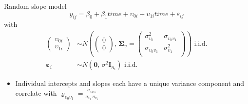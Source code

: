 \documentclass[aspectratio=169]{beamer}
\newcommand{\vect}[1]{\mathbf{#1}}
\newcommand{\mat}[1]{\mathbf{#1}}
\newcommand{\gvect}[1]{\boldsymbol{#1}}
\newcommand{\gmat}[1]{\boldsymbol{#1}}
\begin{document}
\begin{frame}[fragile]{Random slope model}
  \[
    y_{ij} = \beta_0 + \beta_1 time + \upsilon_{0i} + \upsilon_{1i} time +
    \varepsilon_{ij}
  \]
with
\begin{align*}
  \begin{pmatrix} \upsilon_{0i}\\ \upsilon_{1i} \end{pmatrix} &\sim
    N \left(\begin{pmatrix} 0\\ 0 \end{pmatrix}, \, \gmat{\Sigma}_\upsilon =
      \begin{pmatrix}
        \sigma^2_{\upsilon_0} & \sigma_{\upsilon_0 \upsilon_1} \\
        \sigma_{\upsilon_0 \upsilon_1} & \sigma^2_{\upsilon_1} \\
      \end{pmatrix} \right)
    \text{ i.i.d.} \\
  \gvect{\varepsilon}_i &\sim N(\vect{0}, \, \sigma^2 \mat{I}_{n_i})
    \text{ i.i.d.}
\end{align*}
  \begin{itemize}
    \item Individual intercepts and slopes each have a unique variance
      component and correlate with $\varrho_{\upsilon_0 \upsilon_1} =
      \frac{\sigma_{\upsilon_0 \upsilon_1}}{\sigma_{\upsilon_0} \,
      \sigma_{\upsilon_1}}$
  \end{itemize}
\end{frame}
\end{document}
